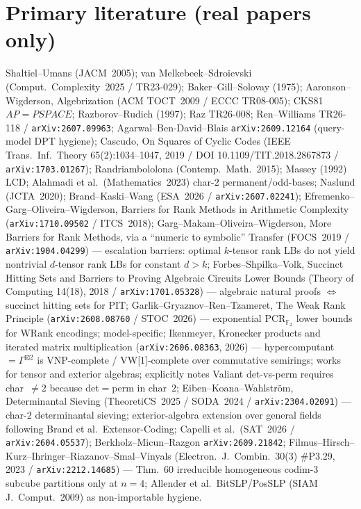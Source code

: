 \documentclass[11pt]{article}
\begin{document}
\section*{Primary literature (real papers only)}
Shaltiel--Umans (JACM~2005); van Melkebeek--Sdroievski (Comput.\ Complexity~2025 /
TR23-029); Baker--Gill--Solovay (1975); Aaronson--Wigderson, Algebrization
(ACM TOCT~2009 / ECCC TR08-005); CKS81 $AP=PSPACE$; Razborov--Rudich (1997);
Raz TR26-008; Ren--Williams TR26-118 / \texttt{arXiv:2607.09963};
Agarwal--Ben-David--Blais \texttt{arXiv:2609.12164} (query-model DPT hygiene);
Cascudo, On Squares of Cyclic Codes (IEEE Trans.\ Inf.\ Theory 65(2):1034--1047,
2019 / DOI 10.1109/TIT.2018.2867873 / \texttt{arXiv:1703.01267});
Randriambololona (Contemp.\ Math.\ 2015); Massey (1992) LCD;
Alahmadi et al.\ (Mathematics~2023) char-$2$ permanent/odd-bases;
Naslund (JCTA~2020); Brand--Kaski--Wang (ESA~2026 / \texttt{arXiv:2607.02241});
Efremenko--Garg--Oliveira--Wigderson, Barriers for Rank Methods in Arithmetic
Complexity (\texttt{arXiv:1710.09502} / ITCS~2018);
Garg--Makam--Oliveira--Wigderson, More Barriers for Rank Methods, via a
``numeric to symbolic'' Transfer (FOCS~2019 / \texttt{arXiv:1904.04299}) ---
escalation barriers: optimal $k$-tensor rank LBs do not yield nontrivial
$d$-tensor rank LBs for constant $d>k$;
Forbes--Shpilka--Volk, Succinct Hitting Sets and Barriers to Proving Algebraic
Circuits Lower Bounds (Theory of Computing 14(18), 2018 /
\texttt{arXiv:1701.05328}) --- algebraic natural proofs $\Leftrightarrow$ succinct
hitting sets for PIT;
Garlik--Gryaznov--Ren--Tzameret, The Weak Rank Principle
(\texttt{arXiv:2608.08760} / STOC~2026) --- exponential PCR$_{\mathbb F_2}$
lower bounds for WRank encodings; model-specific;
Ikenmeyer, Kronecker products and iterated matrix multiplication
(\texttt{arXiv:2606.08363}, 2026) --- hypercomputant $=\Gamma^{\boxtimes 2}$ is
VNP-complete / VW[1]-complete over commutative semirings; works for tensor
and exterior algebras; explicitly notes Valiant det-vs-perm requires
char~$\neq 2$ because det$=$perm in char~$2$;
Eiben--Koana--Wahlstr\"om, Determinantal Sieving (TheoretiCS~2025 / SODA~2024 /
\texttt{arXiv:2304.02091}) --- char-$2$ determinantal sieving; exterior-algebra
extension over general fields following Brand et al.\ Extensor-Coding;
Capelli et al.\ (SAT~2026 / \texttt{arXiv:2604.05537}); Berkholz--Micun--Razgon
\texttt{arXiv:2609.21842}; Filmus--Hirsch--Kurz--Ihringer--Riazanov--Smal--Vinyals
(Electron.\ J.\ Combin.\ 30(3) \#P3.29, 2023 / \texttt{arXiv:2212.14685}) ---
Thm.~60 irreducible homogeneous codim-3 subcube partitions only at $n=4$;
Allender et al.\ BitSLP/PosSLP (SIAM J.\ Comput.\ 2009) as non-importable hygiene.
\end{document}
